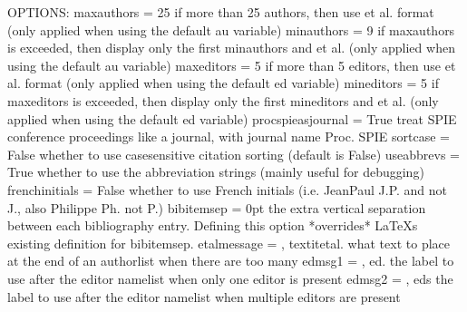 \documentclass[letterpaper,10pt,english]{sphinxmanual}
\begin{document}
\begin{sphinxVerbatim}[commandchars=\\\{\}]
OPTIONS:
maxauthors = 25                           \PYGZsh{}\PYGZsh{} if more than 25 authors, then use \PYGZdq{}et al.\PYGZdq{} format (only applied when using the default \PYGZdq{}\PYGZlt{}au\PYGZgt{}\PYGZdq{} variable)
minauthors = 9                            \PYGZsh{}\PYGZsh{} if \PYGZdq{}maxauthors\PYGZdq{} is exceeded, then display only the first \PYGZdq{}minauthors\PYGZdq{} and et al. (only applied when using the default \PYGZdq{}\PYGZlt{}au\PYGZgt{}\PYGZdq{} variable)
maxeditors = 5                            \PYGZsh{}\PYGZsh{} if more than 5 editors, then use \PYGZdq{}et al.\PYGZdq{} format (only applied when using the default \PYGZdq{}\PYGZlt{}ed\PYGZgt{}\PYGZdq{} variable)
mineditors = 5                            \PYGZsh{}\PYGZsh{} if \PYGZdq{}maxeditors\PYGZdq{} is exceeded, then display only the first \PYGZdq{}mineditors\PYGZdq{} and et al. (only applied when using the default \PYGZdq{}\PYGZlt{}ed\PYGZgt{}\PYGZdq{} variable)
procspie\PYGZus{}as\PYGZus{}journal = True                \PYGZsh{}\PYGZsh{} treat SPIE conference proceedings like a journal, with journal name \PYGZsq{}Proc. SPIE\PYGZsq{}
sort\PYGZus{}case = False                         \PYGZsh{}\PYGZsh{} whether to use case\PYGZhy{}sensitive citation sorting (default is False)
use\PYGZus{}abbrevs = True                        \PYGZsh{}\PYGZsh{} whether to use the abbreviation strings (mainly useful for debugging)
french\PYGZus{}initials = False                   \PYGZsh{}\PYGZsh{} whether to use French initials (i.e. Jean\PYGZhy{}Paul \PYGZhy{}\PYGZgt{} J.\PYGZhy{}P. and not J., also Philippe \PYGZhy{}\PYGZgt{} Ph. not P.)
bibitemsep = 0pt                          \PYGZsh{}\PYGZsh{} the extra vertical separation between each bibliography entry. Defining this option *overrides* LaTeX\PYGZsq{}s existing definition for \PYGZbs{}bibitemsep.
etal\PYGZus{}message = , \PYGZbs{}textit\PYGZob{}et\PYGZti{}al.\PYGZcb{}          \PYGZsh{}\PYGZsh{} what text to place at the end of an authorlist when there are too many
edmsg1 = , ed.                            \PYGZsh{}\PYGZsh{} the label to use after the editor namelist when only one editor is present
edmsg2 = , eds                            \PYGZsh{}\PYGZsh{} the label to use after the editor namelist when multiple editors are present


\end{sphinxVerbatim}
\end{document}
